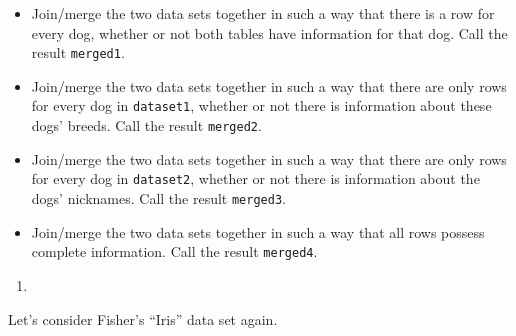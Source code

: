 \documentclass[
  12pt,
  krantz2]{krantz}
\providecommand{\tightlist}{%
  \setlength{\itemsep}{0pt}\setlength{\parskip}{0pt}}
\begin{document}
\begin{itemize}
\tightlist
\item
  Join/merge the two data sets together in such a way that there is a row for every dog, whether or not both tables have information for that dog. Call the result \texttt{merged1}.
\item
  Join/merge the two data sets together in such a way that there are only rows for every dog in \texttt{dataset1}, whether or not there is information about these dogs' breeds. Call the result \texttt{merged2}.
\item
  Join/merge the two data sets together in such a way that there are only rows for every dog in \texttt{dataset2}, whether or not there is information about the dogs' nicknames. Call the result \texttt{merged3}.
\item
  Join/merge the two data sets together in such a way that all rows possess complete information. Call the result \texttt{merged4}.
\end{itemize}

\begin{enumerate}
\def\labelenumi{\arabic{enumi}.}
\setcounter{enumi}{3}
\tightlist
\item
\end{enumerate}

Let's consider Fisher's ``Iris'' data set \citep{misc_iris_53} again.
\end{document}
